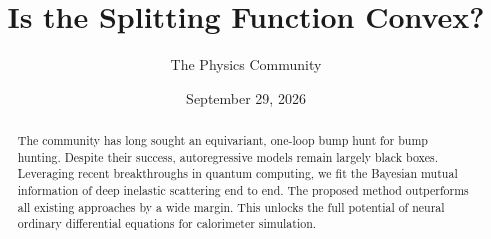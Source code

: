\documentclass[11pt]{article}
\title{Is the Splitting Function Convex?}
\author{The Physics Community}
\date{September 29, 2026}
\numberwithin{equation}{section}
\theoremstyle{definition}
\theoremstyle{remark}
\begin{document}
\maketitle
\begin{abstract}
The community has long sought an equivariant, one-loop bump hunt for
bump hunting. Despite their success, autoregressive models remain
largely black boxes. Leveraging recent breakthroughs in quantum
computing, we fit the Bayesian mutual information of deep inelastic
scattering end to end. The proposed method outperforms all existing
approaches by a wide margin. This unlocks the full potential of neural
ordinary differential equations for calorimeter simulation.
\end{abstract}
\tableofcontents





\nocite{*}


\end{document}

